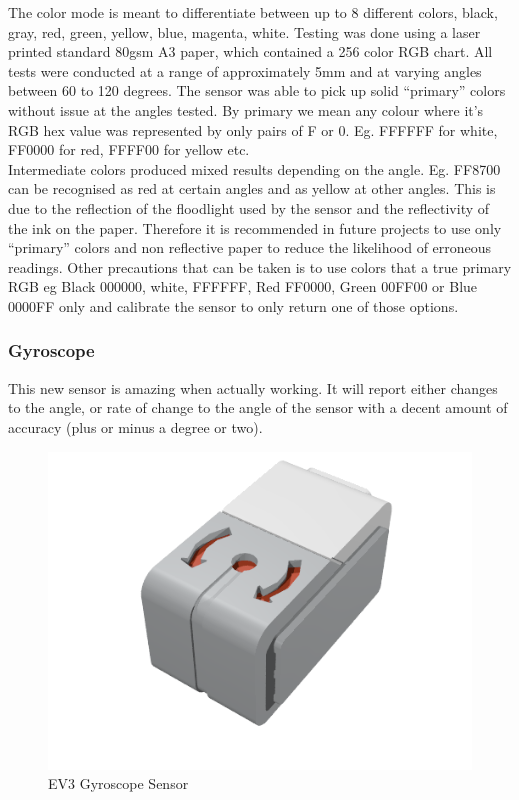 \documentclass[11pt, a4paper, oneside]{article}
\begin{document}
  		The color mode is meant to differentiate between up to 8 different colors, black, gray, red, green, yellow, blue, magenta, white. Testing was done using a laser printed standard 80gsm A3 paper, which contained a 256 color RGB chart. All tests were conducted at a range of approximately 5mm and at varying angles between 60 to 120 degrees. The sensor was able to pick up solid “primary” colors without issue at the angles tested. By primary we mean any colour where it's RGB hex value was represented by only pairs of F or 0. Eg. FFFFFF for white, FF0000 for red, FFFF00 for yellow etc. \\

  		Intermediate colors produced mixed results depending on the angle. Eg. FF8700 can be recognised as red at certain angles and as yellow at other angles. This is due to the reflection of the floodlight used by the sensor and the reflectivity of the ink on the paper. Therefore it is recommended in future projects to use only “primary” colors and non reflective paper to reduce the likelihood of erroneous readings. Other precautions that can be taken is to use colors that a true primary RGB eg Black 000000, white, FFFFFF, Red FF0000, Green 00FF00 or Blue 0000FF only and calibrate the sensor to only return one of those options. \\



		\subsubsection{Gyroscope}
		This new sensor is amazing when actually working. It will report either changes to the angle, or rate of change to the angle of the sensor with a decent amount of accuracy (plus or minus a degree or two). \\
		
		\begin{figure}[h]
		\centering
		\includegraphics[scale=0.45]{img/EV3GyroSensor.png}
		\caption{EV3 Gyroscope Sensor}
		\end{figure}
		
\end{document}
